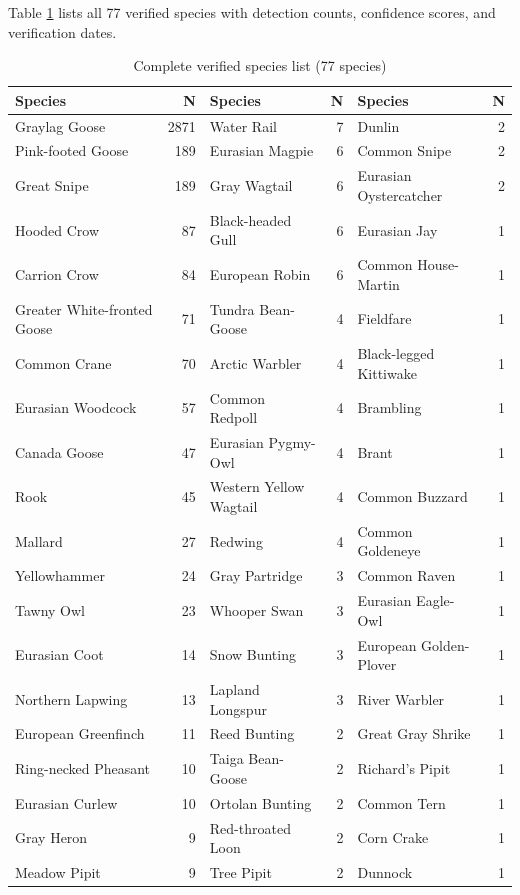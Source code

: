 \documentclass[twocolumn]{article}
\begin{document}
Table \ref{tab:species_full} lists all 77 verified species with detection counts, confidence scores, and verification dates.

\begin{table}[H]
\centering
\caption{Complete verified species list (77 species)}
\label{tab:species_full}
\tiny
\begin{tabular}{lr|lr|lr}
\toprule
\textbf{Species} & \textbf{N} & \textbf{Species} & \textbf{N} & \textbf{Species} & \textbf{N} \\
\midrule
Graylag Goose & 2871 & Water Rail & 7 & Dunlin & 2 \\
Pink-footed Goose & 189 & Eurasian Magpie & 6 & Common Snipe & 2 \\
Great Snipe & 189 & Gray Wagtail & 6 & Eurasian Oystercatcher & 2 \\
Hooded Crow & 87 & Black-headed Gull & 6 & Eurasian Jay & 1 \\
Carrion Crow & 84 & European Robin & 6 & Common House-Martin & 1 \\
Greater White-fronted Goose & 71 & Tundra Bean-Goose & 4 & Fieldfare & 1 \\
Common Crane & 70 & Arctic Warbler & 4 & Black-legged Kittiwake & 1 \\
Eurasian Woodcock & 57 & Common Redpoll & 4 & Brambling & 1 \\
Canada Goose & 47 & Eurasian Pygmy-Owl & 4 & Brant & 1 \\
Rook & 45 & Western Yellow Wagtail & 4 & Common Buzzard & 1 \\
Mallard & 27 & Redwing & 4 & Common Goldeneye & 1 \\
Yellowhammer & 24 & Gray Partridge & 3 & Common Raven & 1 \\
Tawny Owl & 23 & Whooper Swan & 3 & Eurasian Eagle-Owl & 1 \\
Eurasian Coot & 14 & Snow Bunting & 3 & European Golden-Plover & 1 \\
Northern Lapwing & 13 & Lapland Longspur & 3 & River Warbler & 1 \\
European Greenfinch & 11 & Reed Bunting & 2 & Great Gray Shrike & 1 \\
Ring-necked Pheasant & 10 & Taiga Bean-Goose & 2 & Richard's Pipit & 1 \\
Eurasian Curlew & 10 & Ortolan Bunting & 2 & Common Tern & 1 \\
Gray Heron & 9 & Red-throated Loon & 2 & Corn Crake & 1 \\
Meadow Pipit & 9 & Tree Pipit & 2 & Dunnock & 1 \\

\end{tabular}
\end{table}
\end{document}
